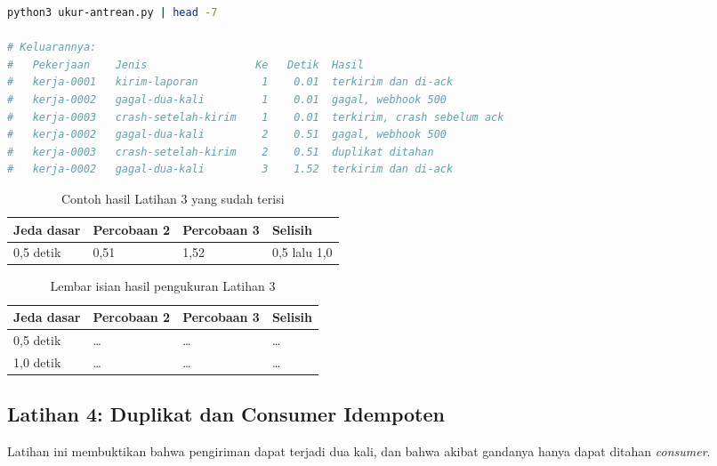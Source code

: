 \begin{lstlisting}[language=bash, caption={Menjalankan satu daur antrean, tersedia di \berkas{sources/chapter13/ukur-antrean.py}}, label={lst:c13-lat3-jalan}]
python3 ukur-antrean.py | head -7

# Keluarannya:
#   Pekerjaan    Jenis                 Ke   Detik  Hasil
#   kerja-0001   kirim-laporan          1    0.01  terkirim dan di-ack
#   kerja-0002   gagal-dua-kali         1    0.01  gagal, webhook 500
#   kerja-0003   crash-setelah-kirim    1    0.01  terkirim, crash sebelum ack
#   kerja-0002   gagal-dua-kali         2    0.51  gagal, webhook 500
#   kerja-0003   crash-setelah-kirim    2    0.51  duplikat ditahan
#   kerja-0002   gagal-dua-kali         3    1.52  terkirim dan di-ack
\end{lstlisting}

\begin{table}[!htb]
  \centering
  \caption{Contoh hasil Latihan 3 yang sudah terisi}
  \label{tab:c13-lat3-contoh}
  \begin{tabularx}{\textwidth}{Xlll}
    \hline
    \textbf{Jeda dasar} & \textbf{Percobaan 2} & \textbf{Percobaan 3} & \textbf{Selisih} \\
    \hline
    0,5 detik & 0,51 & 1,52 & 0,5 lalu 1,0 \\
    \hline
  \end{tabularx}
\end{table}

\begin{table}[!htb]
  \centering
  \caption{Lembar isian hasil pengukuran Latihan 3}
  \label{tab:c13-lat3-hasil}
  \begin{tabularx}{\textwidth}{Xlll}
    \hline
    \textbf{Jeda dasar} & \textbf{Percobaan 2} & \textbf{Percobaan 3} & \textbf{Selisih} \\
    \hline
    0,5 detik & \dots & \dots & \dots \\
    \hline
    1,0 detik & \dots & \dots & \dots \\
    \hline
  \end{tabularx}
\end{table}

\subsection*{Latihan 4: Duplikat dan Consumer Idempoten}

Latihan ini membuktikan bahwa pengiriman dapat terjadi dua kali, dan bahwa
akibat gandanya hanya dapat ditahan \textit{consumer}.

